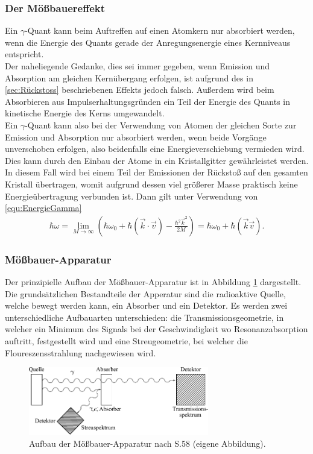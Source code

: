 \documentclass[a4paper,twoside,final]{article}
\begin{document}
\subsubsection{Der Mößbauereffekt}
Ein $\gamma$-Quant kann beim Auftreffen auf einen Atomkern nur absorbiert werden, wenn die Energie des Quants gerade der Anregungsenergie eines Kernniveaus entspricht. \\
Der naheliegende Gedanke, dies sei immer gegeben, wenn Emission und Absorption am gleichen Kernübergang erfolgen, ist aufgrund des in \ref{sec:Rückstoss} beschriebenen Effekts jedoch falsch. Außerdem wird beim Absorbieren aus Impulserhaltungsgründen ein Teil der Energie des Quants in kinetische Energie des Kerns umgewandelt. \\
Ein $\gamma$-Quant kann also bei der Verwendung von Atomen der gleichen Sorte zur Emission und Absorption nur absorbiert werden, wenn beide Vorgänge unverschoben erfolgen, also beidenfalls eine Energieverschiebung vermieden wird. Dies kann durch den Einbau der Atome in ein Kristallgitter gewährleistet werden. In diesem Fall wird bei einem Teil der Emissionen der Rückstoß auf den gesamten Kristall übertragen, womit aufgrund dessen viel größerer Masse praktisch keine Energieübertragung verbunden ist. Dann gilt unter Verwendung von \eqref{equ:EnergieGamma}
\begin{align}\label{eqn:Dopplereffekt}
\hbar\omega = \lim\limits_{M \to \infty}{\left(\hbar \omega_0 + \hbar (\vec{k}\cdot\vec{v})-\frac{\hbar^2\vec{k}^2}{2M}\right)} = \hbar\omega_0+\hbar(\vec{k}\vec{v}).
\end{align}

\subsubsection{Mößbauer-Apparatur}
Der prinzipielle Aufbau der Mößbauer-Apparatur ist in Abbildung \ref{fig:Apparatur} dargestellt. Die grundsätzlichen Bestandteile der Apperatur sind die radioaktive Quelle, welche bewegt werden kann, ein Absorber und ein Detektor. Es werden zwei unterschiedliche Aufbauarten unterschieden: die Transmissionsgeometrie, in welcher ein Minimum des Signals bei der Geschwindigkeit wo Resonanzabsorption auftritt, festgestellt wird und eine Streugeometrie, bei welcher die Floureszensstrahlung nachgewiesen wird.
\begin{figure}[htp]
    \centering
    \includegraphics[width=0.7\textwidth]{Bilder/Apparatur.pdf}
    \caption{Aufbau der Mößbauer-Apparatur nach \cite{Schatz} S.58 (eigene Abbildung).}
    \label{fig:Apparatur}
\end{figure}
\end{document}
